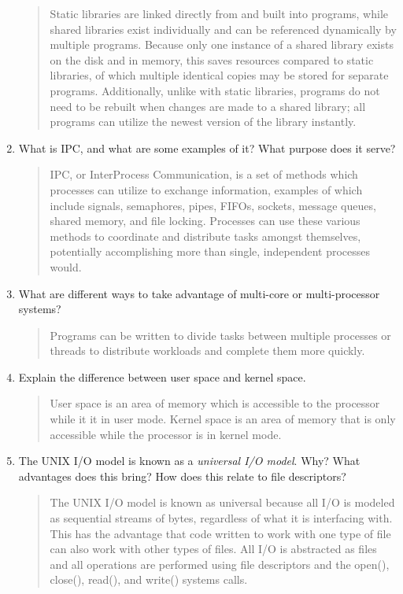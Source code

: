 \documentclass[letterpaper,10pt,onecolumn,titlepage]{article}
\begin{document}
\begin{enumerate}[itemsep=0.1 in]
\begin{quote}
Static libraries are linked directly from and built into programs, while shared libraries exist individually and can be referenced dynamically by multiple programs.  Because only one instance of a shared library exists on the disk and in memory, this saves resources compared to static libraries, of which multiple identical copies may be stored for separate programs.  Additionally, unlike with static libraries, programs do not need to be rebuilt when changes are made to a shared library; all programs can utilize the newest version of the library instantly.
\end{quote}

\item What is IPC, and what are some examples of it? What purpose does it serve?

\begin{quote}
IPC, or InterProcess Communication, is a set of methods which processes can utilize to exchange information, examples of which include signals, semaphores, pipes, FIFOs, sockets, message queues, shared memory, and file locking.  Processes can use these various methods to coordinate and distribute tasks amongst themselves, potentially accomplishing more than single, independent processes would.
\end{quote}

\item What are different ways to take advantage of multi-core or multi-processor systems?

\begin{quote}
Programs can be written to divide tasks between multiple processes or threads to distribute workloads and complete them more quickly.
\end{quote}

\item Explain the difference between user space and kernel space.

\begin{quote}
User space is an area of memory which is accessible to the processor while it it in user mode.  Kernel space is an area of memory that is only accessible while the processor is in kernel mode.
\end{quote}

\item The UNIX I/O model is known as a \emph{universal I/O model}. Why? What advantages
  does this bring? How does this relate to file descriptors?

\begin{quote}
  The UNIX I/O model is known as universal because all I/O is modeled as sequential streams of bytes, regardless of what it is interfacing with.  This has the advantage that code written to work with one type of file can also work with other types of files.  All I/O is abstracted as files and all operations are performed using file descriptors and the open(), close(), read(), and write() systems calls.
\end{quote}


\end{enumerate}
\end{document}
